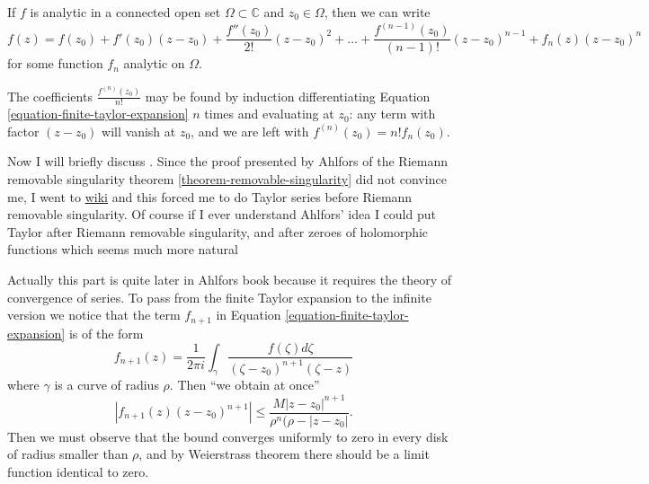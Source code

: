 \begin{lemma}
\label{lemma-finite-taylor-expansion}
\begin{reference}
\cite[Chapter 4, Section 3, Subsection 2, Theorem 8]{ahl}
\end{reference}
If $f$ is analytic in a connected open set $\Omega\subset\mathbb{C}$ and $z_0 \in \Omega$,
then we can write
\begin{equation}
\label{equation-finite-taylor-expansion}
f(z)=f(z_0)+f'(z_0)(z-z_0)+\frac{f''(z_0)}{2!}(z-z_0)^2+\ldots
+\frac{f^{(n-1)}(z_0)}{(n-1)!}(z-z_0)^{n-1}+f_n(z)(z-z_0)^n
\end{equation}
for some function $f_n$ analytic on $\Omega$.
\end{lemma}

\noindent
The coefficients $\frac{f^{(n)}(z_0)}{n!}$ may be found
by induction differentiating
Equation \ref{equation-finite-taylor-expansion} $n$ times
and evaluating at $z_0$:
any term with
factor $(z-z_0)$ will vanish at $z_0$, and we are left with
$f^{(n)}(z_0)=n!f_n(z_0)$.

\medskip\noindent
\begin{remark}
\label{remark-taylor-before}
Now I will briefly discuss \cite[Section 1.2, Chapter 5]{Ahlfors}.
Since the proof presented by Ahlfors of the 
Riemann removable singularity theorem \ref{theorem-removable-singularity}
did not convince me,
I went to \href{https://en.wikipedia.org/wiki/Removable_singularity}{wiki}
and this forced me to do Taylor series before Riemann removable singularity.
Of course if I ever understand Ahlfors' idea I could put Taylor after
Riemann removable singularity, and after zeroes of holomorphic functions
which seems much more natural
\end{remark}

\medskip\noindent
Actually this part is quite later in Ahlfors book because it requires
the theory of convergence of series.
To pass from the finite Taylor expansion to the
infinite version we notice that the 
term $f_{n+1}$ in Equation \ref{equation-finite-taylor-expansion}
is of the form
$$
f_{n+1}(z)=\frac{1}{2\pi i}\int_\gamma \frac{f(\zeta)d\zeta}
{(\zeta-z_0)^{n+1}(\zeta-z)}
$$
where $\gamma$ is a curve of radius $\rho$.
Then ``we obtain at once''
$$
|f_{n+1}(z)(z-z_0)^{n+1}|\leq \frac{M|z-z_0|^{n+1}}{\rho^n(\rho-|z-z_0|}.
$$
Then we must observe that the bound converges uniformly
to zero in every disk of radius smaller than $\rho$,
and by Weierstrass theorem there should be a limit
function identical to zero.


